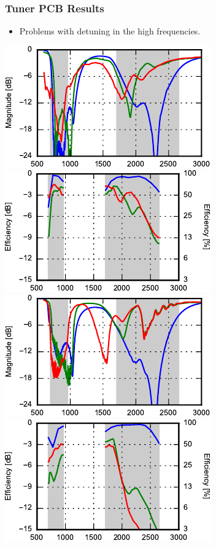 \begin{frame}
  \frametitle{Tuner PCB Results}
  \begin{itemize}
  \item Problems with detuning in the high frequencies.
  \end{itemize}
  \begin{center}
    \includegraphics{img/Lasse/tuner_pcb/001_s11top.pdf}
    \includegraphics{img/Lasse/tuner_pcb/001_efftop.pdf} \\
    \includegraphics{img/Lasse/tuner_pcb/001_s22side.pdf}
    \includegraphics{img/Lasse/tuner_pcb/001_effside.pdf}
  \end{center}
\legendfooter
\end{frame}


